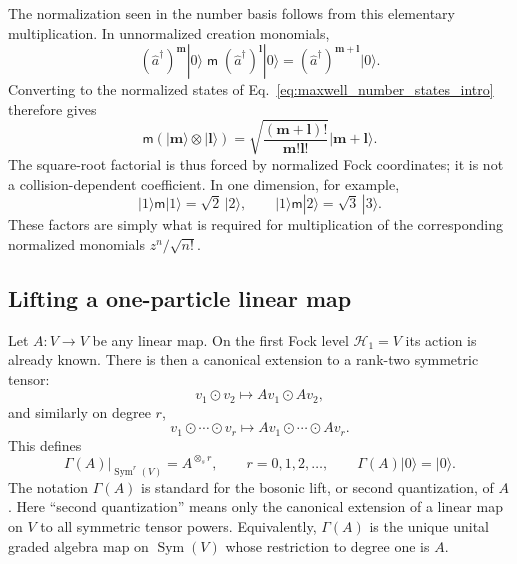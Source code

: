 \documentclass[11pt,oneside]{article}
\numberwithin{equation}{section}
\theoremstyle{definition}
\begin{document}
The normalization seen in the number basis follows from this elementary multiplication.  In unnormalized creation monomials,
\begin{equation}
(\hat a^\dagger)^{\bm m}|0\rangle
\;\mathsf m\;
(\hat a^\dagger)^{\bm l}|0\rangle
=
(\hat a^\dagger)^{\bm m+\bm l}|0\rangle.
\label{eq:maxwell_fusion_unnormalized}
\end{equation}
Converting to the normalized states of Eq.~\eqref{eq:maxwell_number_states_intro} therefore gives
\begin{equation}
\mathsf m(|\bm m\rangle\otimes|\bm l\rangle)
=
\sqrt{\frac{(\bm m+\bm l)!}{\bm m!\bm l!}}
|\bm m+\bm l\rangle.
\label{eq:maxwell_fusion_number}
\end{equation}
The square-root factorial is thus forced by normalized Fock coordinates; it is not a collision-dependent coefficient.  In one dimension, for example,
\begin{equation}
|1\rangle\mathsf m|1\rangle=\sqrt2\,|2\rangle,
\qquad
|1\rangle\mathsf m|2\rangle=\sqrt3\,|3\rangle.
\label{eq:maxwell_fusion_low_example}
\end{equation}
These factors are simply what is required for multiplication of the corresponding normalized monomials $z^n/\sqrt{n!}$.

\subsection{Lifting a one-particle linear map}
\label{subsec:maxwell_lift_explained}

Let $A:V\to V$ be any linear map.  On the first Fock level $\mathscr H_1=V$ its action is already known.  There is then a canonical extension to a rank-two symmetric tensor:
\begin{equation}
v_1\odot v_2
\longmapsto
Av_1\odot Av_2,
\end{equation}
and similarly on degree $r$,
\begin{equation}
v_1\odot\cdots\odot v_r
\longmapsto
Av_1\odot\cdots\odot Av_r.
\label{eq:maxwell_lift_elementary_tensor}
\end{equation}
This defines
\begin{equation}
\Gamma(A)\big|_{\operatorname{Sym}^r(V)}
=A^{\otimes_s r},
\qquad r=0,1,2,\ldots,
\qquad
\Gamma(A)|0\rangle=|0\rangle.
\label{eq:maxwell_Gamma_sector}
\end{equation}
The notation $\Gamma(A)$ is standard for the bosonic lift, or second quantization, of $A$ \cite{Cook1951SecondQuantization,Segal1956TensorAlgebras}.  Here ``second quantization'' means only the canonical extension of a linear map on $V$ to all symmetric tensor powers.  Equivalently, $\Gamma(A)$ is the unique unital graded algebra map on $\operatorname{Sym}(V)$ whose restriction to degree one is $A$.
\end{document}
